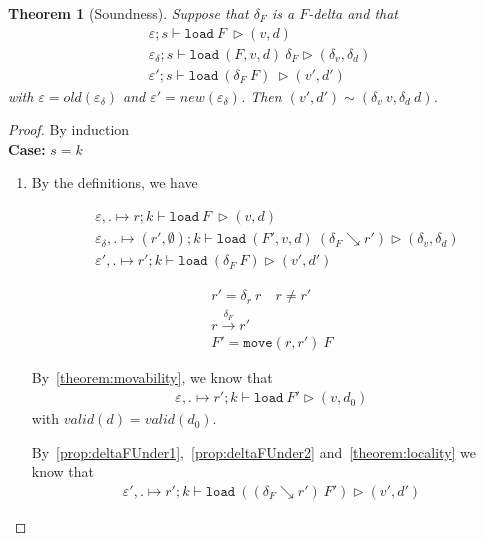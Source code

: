 \documentclass[10pt,twoside,a4paper]{article}
\theoremstyle{theorem}
\newtheorem{theorem}{Theorem}[section]
\theoremstyle{lemma}
\theoremstyle{property}
\begin{document}
\begin{theorem}[Soundness]
	Suppose that $\delta_F$ is a $F$-delta and that
	\begin{align*}
		\varepsilon ; s \vdash \mathtt{load}~ F~ \rhd (v,d)\\
		\varepsilon_\delta ; s \vdash \mathtt{load}~ (F,v,d)~ \delta_F \rhd (\delta_v,\delta_d)\\
		\varepsilon' ; s \vdash \mathtt{load}~ (\delta_F~F)~ \rhd (v',d')
	\end{align*}
	with $\varepsilon = old(\varepsilon_\delta)$ and $\varepsilon' = new(\varepsilon_\delta)$.
	Then $(v',d') \sim (\delta_v ~ v,\delta_d ~ d)$.
\end{theorem}
\begin{proof}By induction\\
	\textbf{Case: } $s = k$\\
	\begin{enumerate}
		\item
		By the definitions, we have
		
	\begin{minipage}[b]{0.45\textwidth}
		\begin{align*}
			&\varepsilon , . \mapsto r ; k \vdash \mathtt{load}~ F~ \rhd (v,d) \\
			&\varepsilon_\delta , . \mapsto (r',\emptyset) ; k \vdash \mathtt{load}~ (F',v,d)~ (\delta_F \searrow r') \rhd (\delta_v,\delta_d) \\
			&\varepsilon' , . \mapsto r' ; k \vdash \mathtt{load}~ (\delta_F ~ F) \rhd (v',d')
		\end{align*}
	\end{minipage}
	\begin{minipage}[b]{0.45\textwidth}
		\begin{align*}
			r' = \delta_r ~ r \quad r \neq r'\\
			r \xrightarrow{\delta_F} r'\\
			F' = \mathtt{move}(r,r')~F
		\end{align*}
	\end{minipage}
	
	By~\ref{theorem:movability}, we know that
	\begin{align*}
		\varepsilon , . \mapsto r' ; k \vdash \mathtt{load}~ F' \rhd (v,d_0)
	\end{align*}
	with $valid(d) = valid(d_0)$.
	
	By~\ref{prop:deltaFUnder1},~\ref{prop:deltaFUnder2} and~\ref{theorem:locality} we know that
	\begin{align*}
		\varepsilon' , . \mapsto r' ; k \vdash \mathtt{load}~ ((\delta_F \searrow r') ~ F') \rhd (v',d')
	\end{align*}
	

\end{enumerate}
\end{proof}
\end{document}
